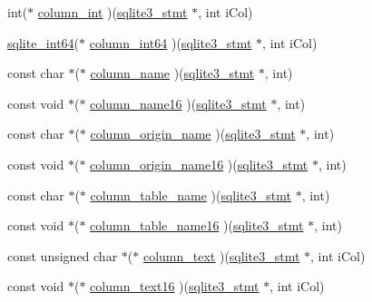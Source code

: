 \begin{DoxyCompactItemize}
\item 
int($\ast$ \hyperlink{structsqlite3__api__routines_a6211d95cf114f26cb48eed02d3b5eb70}{column\-\_\-int} )(\hyperlink{sqlite3_8c_af2a033da1327cdd77f0a174a09aedd0c}{sqlite3\-\_\-stmt} $\ast$, int i\-Col)
\item 
\hyperlink{sqlite3_8c_a520a95f9080c018b2fade39885bd2e2a}{sqlite\-\_\-int64}($\ast$ \hyperlink{structsqlite3__api__routines_a523a8d125fe83c9ea45eb4057a4d2458}{column\-\_\-int64} )(\hyperlink{sqlite3_8c_af2a033da1327cdd77f0a174a09aedd0c}{sqlite3\-\_\-stmt} $\ast$, int i\-Col)
\item 
const char $\ast$($\ast$ \hyperlink{structsqlite3__api__routines_a3bafa95a9ba845fa19408e9c3ac9aa69}{column\-\_\-name} )(\hyperlink{sqlite3_8c_af2a033da1327cdd77f0a174a09aedd0c}{sqlite3\-\_\-stmt} $\ast$, int)
\item 
const void $\ast$($\ast$ \hyperlink{structsqlite3__api__routines_a1c7063d3e335648a8482fb1cdc46a627}{column\-\_\-name16} )(\hyperlink{sqlite3_8c_af2a033da1327cdd77f0a174a09aedd0c}{sqlite3\-\_\-stmt} $\ast$, int)
\item 
const char $\ast$($\ast$ \hyperlink{structsqlite3__api__routines_a6927f22bc705f4e518b1bc4a5d06a15d}{column\-\_\-origin\-\_\-name} )(\hyperlink{sqlite3_8c_af2a033da1327cdd77f0a174a09aedd0c}{sqlite3\-\_\-stmt} $\ast$, int)
\item 
const void $\ast$($\ast$ \hyperlink{structsqlite3__api__routines_ac2ae192edc01c361562796e873f33134}{column\-\_\-origin\-\_\-name16} )(\hyperlink{sqlite3_8c_af2a033da1327cdd77f0a174a09aedd0c}{sqlite3\-\_\-stmt} $\ast$, int)
\item 
const char $\ast$($\ast$ \hyperlink{structsqlite3__api__routines_a1fc9721d32d8d99d26a97cae6882c34a}{column\-\_\-table\-\_\-name} )(\hyperlink{sqlite3_8c_af2a033da1327cdd77f0a174a09aedd0c}{sqlite3\-\_\-stmt} $\ast$, int)
\item 
const void $\ast$($\ast$ \hyperlink{structsqlite3__api__routines_af01a003033c1ce2c671e495d35cf00eb}{column\-\_\-table\-\_\-name16} )(\hyperlink{sqlite3_8c_af2a033da1327cdd77f0a174a09aedd0c}{sqlite3\-\_\-stmt} $\ast$, int)
\item 
const unsigned char $\ast$($\ast$ \hyperlink{structsqlite3__api__routines_a958266b11061644abc6a542b30c0dded}{column\-\_\-text} )(\hyperlink{sqlite3_8c_af2a033da1327cdd77f0a174a09aedd0c}{sqlite3\-\_\-stmt} $\ast$, int i\-Col)
\item 
const void $\ast$($\ast$ \hyperlink{structsqlite3__api__routines_a1e92761b9b7068a45dcb576229d1995a}{column\-\_\-text16} )(\hyperlink{sqlite3_8c_af2a033da1327cdd77f0a174a09aedd0c}{sqlite3\-\_\-stmt} $\ast$, int i\-Col)

\end{DoxyCompactItemize}
